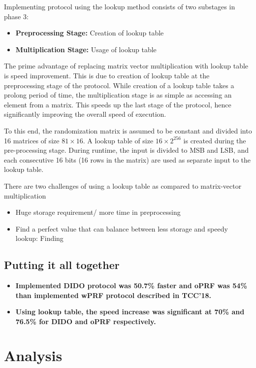 Implementing protocol using the lookup method consists of two substages in phase 3:\\
\begin{itemize}
	\item{\textbf{Preprocessing Stage: } Creation of lookup table}
	\item{\textbf{Multiplication Stage: } Usage of lookup table}
\end{itemize}


The prime advantage of replacing matrix vector multiplication with lookup table is speed improvement. This is due to creation of lookup table at the preprocessing stage of the protocol. While creation of a lookup table takes a prolong period of time, the multiplication stage is as simple as accessing an element from a matrix. This speeds up the last stage of the protocol, hence significantly improving the overall speed of execution.


To this end, the randomization matrix is assumed to be constant and divided into 16 matrices of size $81 \times 16$. A lookup table of size $16 \times 2^{256}$ is created during the pre-processing stage. During runtime, the input is divided to MSB and LSB, and each consecutive 16 bits (16 rows in the matrix) are used as separate input to the lookup table. 

There are two challenges of using a lookup table as compared to matrix-vector multiplication
\begin{itemize}
	\item{Huge storage requirement/ more time in preprocessing}
	\item{Find a perfect value that can balance between less storage and speedy lookup: Finding }
\end{itemize}

\subsection{Putting it all together}

\begin{itemize}
	\item{\textbf{Implemented DIDO protocol was 50.7\% faster and oPRF was 54\% than implemented wPRF protocol described in TCC'18.}}
	\item{\textbf{Using lookup table, the speed increase was significant at 70\% and 76.5\% for DIDO and oPRF respectively.}}
\end{itemize}

\section{Analysis}

